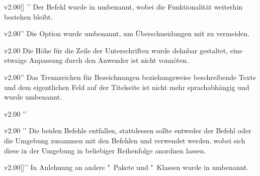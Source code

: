 \begin{Obsolete}{v2.00}{[]}%
  ''%
\printdeclarationlist%
%
Der Befehl  wurde in  umbenannt, wobei die 
Funktionalität weiterhin bestehen bleibt.
\end{Obsolete}

\begin{Obsolete}{v2.00}{}''
\printdeclarationlist%
%
Die Option wurde umbenannt, um Überschneidungen mit  zu 
vermeiden.
\end{Obsolete}

\begin{Obsolete}{v2.00}{}
\printdeclarationlist%
%
Die Höhe für die Zeile der Unterschriften wurde dehnbar gestaltet, eine etwaige 
Anpassung durch den Anwender ist nicht vonnöten.
\end{Obsolete}

\begin{Obsolete}{v2.00}{}''
\printdeclarationlist%
%
Das Trennzeichen für Bezeichnungen beziehungsweise beschreibende Texte und dem 
eigentlichen Feld auf der Titelseite ist nicht mehr sprachabhängig und wurde 
umbenannt.
\end{Obsolete}

\begin{Obsolete}{v2.00}{}%
  ''
\begin{Obsolete}{v2.00}{}%
  ''
\printdeclarationlist%
%
Die beiden Befehle entfallen, stattdessen sollte entweder der Befehl 
 oder die Umgebung  zusammen mit 
den Befehlen  und  verwendet werden, 
wobei sich diese in der Umgebung in beliebiger Reihenfolge anordnen lassen.
\end{Obsolete}
\end{Obsolete}

\begin{Obsolete}{v2.00}{[]}''
\printdeclarationlist%
%
In Anlehnung an andere "~Pakete und "~Klassen wurde 
 in  umbenannt.
\end{Obsolete}


